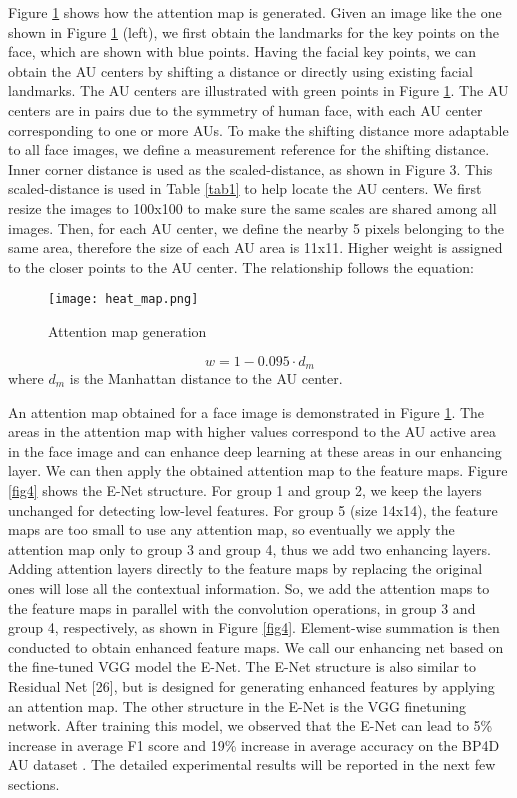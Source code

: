 \documentclass[a4paper, 10pt, conference]{ieeeconf}      %
\begin{document}
Figure \ref{fig3} shows how the attention map is generated. Given an image like the one shown in Figure \ref{fig3} (left), we first obtain the landmarks for the key points on the face, which are shown with blue points. Having the facial key points, we can obtain the AU centers by shifting a distance or directly using existing facial landmarks. The AU centers are illustrated with green points in Figure \ref{fig3}. The AU centers are in pairs due to the symmetry of human face, with each AU center corresponding to one or more AUs. To make the shifting distance more adaptable to all face images, we define a measurement reference for the shifting distance. Inner corner distance is used as the scaled-distance, as shown in Figure 3. This scaled-distance is used in Table \ref{tab1} to help locate the AU centers. We first resize the images to 100x100 to make sure the same scales are shared among all images. Then, for each AU center, we define the nearby 5 pixels belonging to the same area, therefore the size of each AU area is 11x11. Higher weight is assigned to the closer points to the AU center. The relationship follows the equation: 

 \begin{figure}[thpb]
      \centering
      \texttt{[image: heat\_map.png]}
      \caption{Attention map generation}
      \label{fig3}
   \end{figure}

\begin{equation}
w=1-0.095\cdot d_{m}
\end{equation}
where $d_{m}$ is the Manhattan distance to the AU center. 
 
An attention map obtained for a face image is demonstrated in Figure \ref{fig3}. The areas in the attention map with higher values correspond to the AU active area in the face image and can enhance deep learning at these areas in our enhancing layer. 
We can then apply the obtained attention map to the feature maps. Figure \ref{fig4} shows the E-Net structure. For group 1 and group 2, we keep the layers unchanged for detecting low-level features. For group 5 (size 14x14), the feature maps are too small to use any attention map, so eventually we apply the attention map only to group 3 and group 4, thus we add two enhancing layers. Adding attention layers directly to the feature maps by replacing the original ones will lose all the contextual information. So, we add the attention maps to the feature maps in parallel with the convolution operations, in group 3 and group 4, respectively, as shown in Figure \ref{fig4}. Element-wise summation is then conducted to obtain enhanced feature maps. We call our enhancing net based on the fine-tuned VGG model the E-Net. The E-Net structure is also similar to Residual Net [26], but is designed for generating enhanced features by applying an attention map.  The other structure in the E-Net is the VGG finetuning network. After training this model, we observed that the E-Net can lead to 5\% increase in average F1 score and 19\% increase in average accuracy on the BP4D AU dataset \cite{p27}. The detailed experimental results will be reported in the next few sections.
\end{document}
